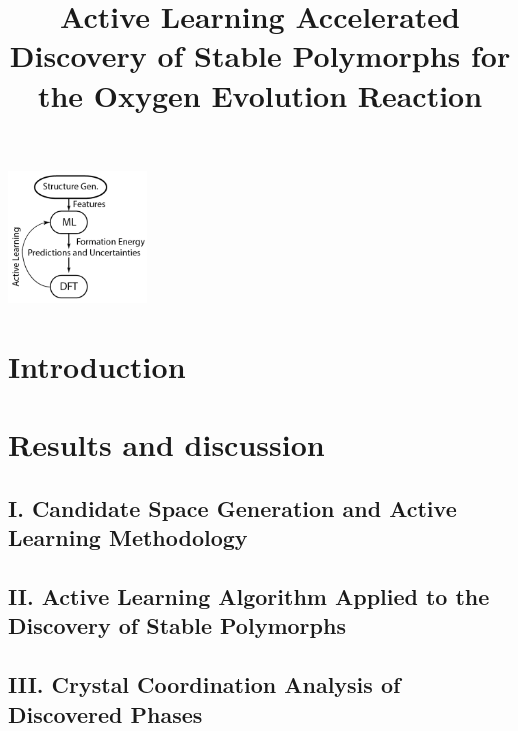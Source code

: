 \documentclass[%
  journal=cmatex,
  manuscript=article,
  ]{achemso}
\title[ML discovered \IrOx phases]{
Active Learning Accelerated Discovery of Stable \IrOx Polymorphs for the Oxygen Evolution Reaction
}
\begin{document}
\begin{tocentry}
\begin{center}
\includegraphics[height=3.5cm]{02_figures/al_diagram/Surrogate_model}
\end{center}
\end{tocentry}


\begin{abstract}

\end{abstract}

\section{Introduction}


\section{Results and discussion}

  \subsection{I. Candidate Space Generation and Active Learning Methodology}
  

  \subsection{II. Active Learning Algorithm Applied to the Discovery of Stable \IrOx Polymorphs}
  

  \subsection{III. Crystal Coordination Analysis of Discovered Phases}
  
\end{document}
